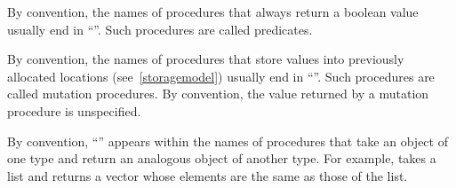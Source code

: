 By convention, the names of procedures that always return a boolean
value usually end
in ``''.  Such procedures are called predicates.

By convention, the names of procedures that store values into previously
allocated locations (see~\ref{storagemodel}) usually end in
``\ide{!}''.
Such procedures are called mutation procedures.
By convention, the value returned by a mutation procedure is unspecified.
\schindex{!}

By convention, ``\ide{->}'' appears within the names of procedures that
take an object of one type and return an analogous object of another type.
For example,  takes a list and returns a vector whose
elements are the same as those of the list.\schindex{->}


	
